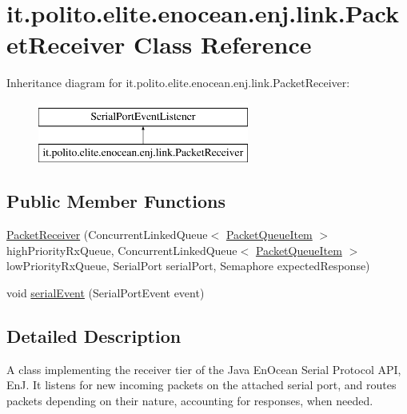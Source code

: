 \hypertarget{classit_1_1polito_1_1elite_1_1enocean_1_1enj_1_1link_1_1_packet_receiver}{}\section{it.\+polito.\+elite.\+enocean.\+enj.\+link.\+Packet\+Receiver Class Reference}
\label{classit_1_1polito_1_1elite_1_1enocean_1_1enj_1_1link_1_1_packet_receiver}
Inheritance diagram for it.\+polito.\+elite.\+enocean.\+enj.\+link.\+Packet\+Receiver\+:\begin{figure}[H]
\begin{center}
\leavevmode
\includegraphics[height=2.000000cm]{classit_1_1polito_1_1elite_1_1enocean_1_1enj_1_1link_1_1_packet_receiver}
\end{center}
\end{figure}
\subsection*{Public Member Functions}
\begin{DoxyCompactItemize}
\item 
\hyperlink{classit_1_1polito_1_1elite_1_1enocean_1_1enj_1_1link_1_1_packet_receiver_a4934daef1e6c68135c73d17ca31edd4a}{Packet\+Receiver} (Concurrent\+Linked\+Queue$<$ \hyperlink{classit_1_1polito_1_1elite_1_1enocean_1_1enj_1_1link_1_1_packet_queue_item}{Packet\+Queue\+Item} $>$ high\+Priority\+Rx\+Queue, Concurrent\+Linked\+Queue$<$ \hyperlink{classit_1_1polito_1_1elite_1_1enocean_1_1enj_1_1link_1_1_packet_queue_item}{Packet\+Queue\+Item} $>$ low\+Priority\+Rx\+Queue, Serial\+Port serial\+Port, Semaphore expected\+Response)
\item 
void \hyperlink{classit_1_1polito_1_1elite_1_1enocean_1_1enj_1_1link_1_1_packet_receiver_a1477aa10b867d41deddc025f5d8850dc}{serial\+Event} (Serial\+Port\+Event event)
\end{DoxyCompactItemize}


\subsection{Detailed Description}
A class implementing the receiver tier of the Java En\+Ocean Serial Protocol A\+PI, EnJ. It listens for new incoming packets on the attached serial port, and routes packets depending on their nature, accounting for responses, when needed.

